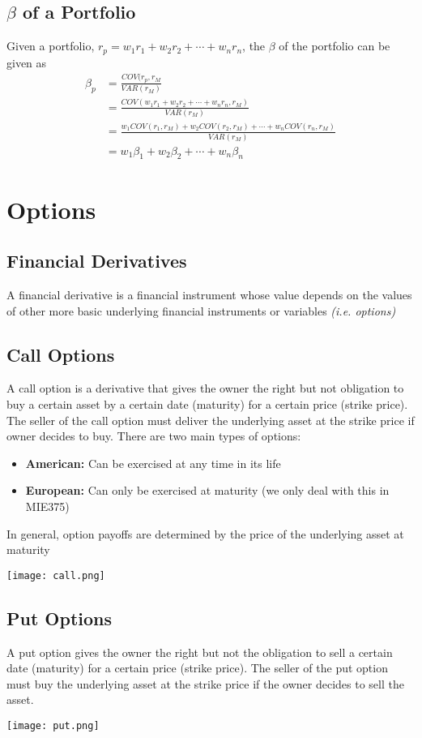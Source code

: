 \documentclass[11pt]{article}
\begin{document}
\subsection{$\beta$ of a Portfolio}
Given a portfolio, $r_p = w_1r_1 + w_2r_2 + \cdots + w_nr_n$, the $\beta$ of the portfolio can be given as 
\begin{align*}
\beta_p &= \frac{COV(r_p, r_M}{VAR(r_M)} \\
&= \frac{COV(w_1r_1 + w_2r_2 + \cdots + w_nr_n, r_M)}{VAR(r_M)} \\
&=\frac{w_1COV(r_1, r_M) + w_2COV(r_2, r_M) + \cdots + w_nCOV(r_n, r_M)}{VAR(r_M)} \\
&= w_1\beta_1 + w_2\beta_2 + \cdots + w_n\beta_n
\end{align*}
\pagebreak

\section{Options}

\subsection{Financial Derivatives}
A financial derivative is a financial instrument whose value depends on the values of other more basic underlying financial instruments or variables \textit{(i.e. options)}
\subsection{Call Options}
A call option is a derivative that gives the owner the right but not obligation to buy a certain asset by a certain date (maturity) for a certain price (strike price). The seller of the call option must deliver the underlying asset at the strike price if owner decides to buy.  There are two main types of options: 
\begin{itemize}
\item \textbf{American:} Can be exercised at any time in its life
\item \textbf{European:} Can only be exercised at maturity (we only deal with this in MIE375) 
\end{itemize}
In general, option payoffs are determined by the price of the underlying asset at maturity
\begin{center}
\texttt{[image: call.png]} 
\end{center}
\subsection{Put Options }
A put option gives the owner the right but not the obligation to sell a certain date (maturity) for a certain price (strike price). The seller of the put option must buy the underlying asset at the strike price if the owner decides to sell the asset. 
\begin{center}
\texttt{[image: put.png]} 
\end{center}
\end{document}
